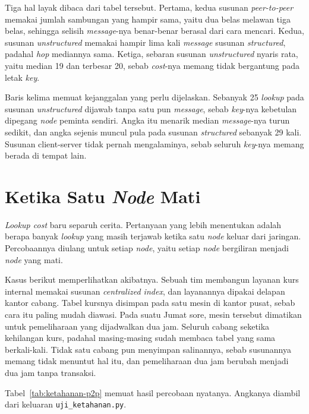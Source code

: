 Tiga hal layak dibaca dari tabel tersebut. Pertama, kedua susunan
\textit{peer-to-peer} memakai jumlah sambungan yang hampir sama, yaitu dua
belas melawan tiga belas, sehingga selisih \textit{message}-nya benar-benar berasal dari
cara mencari. Kedua, susunan \textit{unstructured} memakai hampir lima kali \textit{message}
susunan \textit{structured}, padahal \textit{hop} mediannya sama. Ketiga, sebaran susunan
\textit{unstructured} nyaris rata, yaitu median 19 dan terbesar 20, sebab
\textit{cost}-nya
memang tidak bergantung pada letak \textit{key}.

Baris kelima memuat kejanggalan yang perlu dijelaskan. Sebanyak 25 \textit{lookup}
pada susunan \textit{unstructured} dijawab tanpa satu pun \textit{message}, sebab \textit{key}-nya
kebetulan dipegang \textit{node} peminta sendiri. Angka itu menarik median \textit{message}-nya
turun sedikit, dan angka sejenis muncul pula pada susunan \textit{structured} sebanyak
29 kali. Susunan client-server tidak pernah mengalaminya, sebab seluruh
\textit{key}-nya memang berada di tempat lain.

\section{Ketika Satu \textit{Node} Mati}

\textit{Lookup cost} baru separuh cerita. Pertanyaan yang lebih menentukan adalah
berapa banyak \textit{lookup} yang masih terjawab ketika satu \textit{node} keluar dari
jaringan. Percobaannya diulang untuk setiap \textit{node}, yaitu setiap \textit{node}
bergiliran menjadi \textit{node} yang mati.

Kasus berikut memperlihatkan akibatnya. Sebuah tim membangun layanan kurs
internal memakai susunan \textit{centralized
index}, dan layanannya dipakai
delapan kantor
cabang. Tabel kursnya disimpan pada satu mesin di kantor pusat, sebab cara itu
paling mudah diawasi. Pada suatu Jumat sore, mesin tersebut dimatikan untuk
pemeliharaan yang dijadwalkan dua jam. Seluruh cabang seketika kehilangan kurs,
padahal masing-masing sudah membaca tabel yang sama berkali-kali. Tidak satu
cabang pun menyimpan salinannya, sebab susunannya memang tidak menuntut hal
itu, dan pemeliharaan dua jam berubah menjadi dua jam tanpa transaksi.

Tabel~\ref{tab:ketahanan-p2p} memuat hasil percobaan nyatanya. Angkanya diambil
dari keluaran \texttt{uji\_ketahanan.py}.


